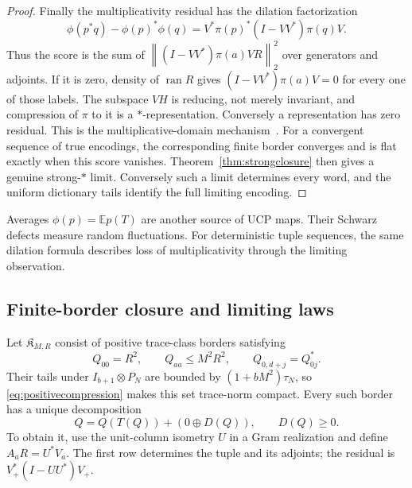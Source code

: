 \documentclass[11pt,a4paper]{amsart}
\numberwithin{equation}{section}
\theoremstyle{definition}
\theoremstyle{remark}
\newcommand{\E}{\mathbb E}
\DeclareMathOperator{\ran}{ran}
\newcommand{\norm}[1]{\left\lVert#1\right\rVert}
\begin{document}
\begin{proof}
Finally the multiplicativity residual has the dilation factorization
\[
 \phi(p^*q)-\phi(p)^*\phi(q)
 =V^*\pi(p)^*(I-VV^*)\pi(q)V.
\]
Thus the score is the sum of $\norm{(I-VV^*)\pi(a)VR}_2^2$ over generators and adjoints. If it is zero, density of $\ran R$ gives $(I-VV^*)\pi(a)V=0$ for every one of those labels. The subspace $VH$ is reducing, not merely invariant, and compression of $\pi$ to it is a $*$-representation. Conversely a representation has zero residual. This is the multiplicative-domain mechanism~\cite{Choi,CJK}. For a convergent sequence of true encodings, the corresponding finite border converges and is flat exactly when this score vanishes. Theorem~\ref{thm:strongclosure} then gives a genuine strong-$*$ limit. Conversely such a limit determines every word, and the uniform dictionary tails identify the full limiting encoding.
\end{proof}

Averages $\phi(p)=\E p(T)$ are another source of UCP maps. Their Schwarz defects measure random fluctuations. For deterministic tuple sequences, the same dilation formula describes loss of multiplicativity through the limiting observation.

\subsection{Finite-border closure and limiting laws}
Let $\mathfrak K_{M,R}$ consist of positive trace-class borders satisfying
\[
 Q_{00}=R^2,\qquad Q_{aa}\le M^2R^2,\qquad Q_{0,d+j}=Q_{0j}^*.
\]
Their tails under $I_{b+1}\otimes P_N$ are bounded by $(1+bM^2)\tau_N$, so \eqref{eq:positivecompression} makes this set trace-norm compact. Every such border has a unique decomposition
\begin{equation}\label{eq:borderresidual}
 Q=Q(T(Q))+(0\oplus D(Q)),\qquad D(Q)\ge0.
\end{equation}
To obtain it, use the unit-column isometry $U$ in a Gram realization and define $A_aR=U^*V_a$. The first row determines the tuple and its adjoints; the residual is $V_+^*(I-UU^*)V_+$.
\end{document}
